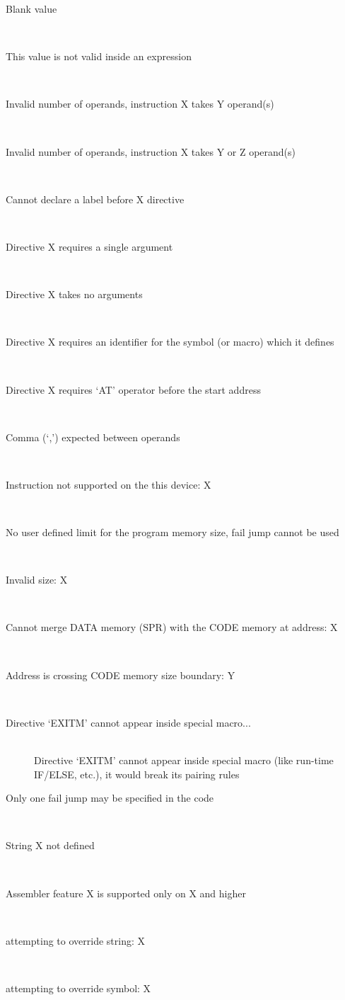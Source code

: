 \begin{description}
        \item[Blank value]~\\
        \item[This value is not valid inside an expression]~\\
        \item[Invalid number of operands, instruction X takes Y operand(s)]~\\
        \item[Invalid number of operands, instruction X takes Y or Z operand(s)]~\\
        \item[Cannot declare a label before X directive]~\\
        \item[Directive X requires a single argument]~\\
        \item[Directive X takes no arguments]~\\
        \item[Directive X requires an identifier for the symbol (or macro) which it defines]~\\
        \item[Directive X requires `AT' operator before the start address]~\\
        \item[Comma (`,') expected between operands]~\\
        \item[Instruction not supported on the this device: X]~\\
        \item[No user defined limit for the program memory size, fail jump cannot be used]~\\
        \item[Invalid size: X]~\\
        \item[Cannot merge DATA memory (SPR) with the CODE memory at address: X]~\\
        \item[Address is crossing CODE memory size boundary: Y]~\\
        \item[Directive `EXITM' cannot appear inside special macro...]~\\
            Directive `EXITM' cannot appear inside special macro (like run-time IF/ELSE, etc.), it would break its pairing rules
        \item[Only one fail jump may be specified in the code]~\\
        \item[String X not defined]~\\
        \item[Assembler feature X is supported only on X and higher]~\\
        \item[attempting to override string: X]~\\
        \item[attempting to override symbol: X]~\\


\end{description}
